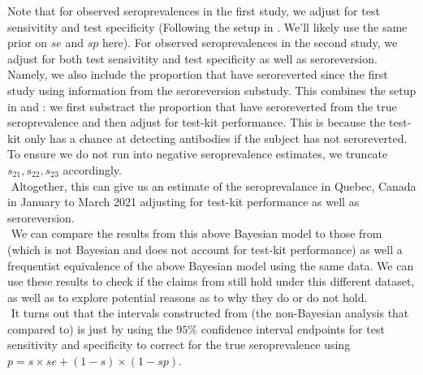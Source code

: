 Note that for observed seroprevalences in the first study, we adjust for test sensivitity and test specificity (Following the setup in \cite{meyer2022adjusting}. We'll likely use the same prior on $se$ and $sp$ here). For observed seroprevalences in the second study, we adjust for both test sensivitity and test specificity as well as seroreversion. Namely, we also include the proportion that have seroreverted since the first study using information from the seroreversion substudy. This combines the setup in \cite{lewin2022seroprevalence} and \cite{meyer2022adjusting}: we first substract the proportion that have seroreverted from the true seroprevalence and then adjust for test-kit performance. This is because the test-kit only has a chance at detecting antibodies if the subject has not seroreverted. To ensure we do not run into negative seroprevalence estimates, we truncate $s_{21}, s_{22}, s_{23}$ accordingly.\\
\newline $ $
Altogether, this can give us an estimate of the seroprevalance in Quebec, Canada in January to March 2021 adjusting for test-kit performance as well as seroreversion.\\
\newline $ $
We can compare the results from this above Bayesian model to those from \cite{lewin2022seroprevalence} (which is not Bayesian and does not account for test-kit performance) as well a frequentist equivalence of the above Bayesian model using the same data. We can use these results to check if the claims from \cite{lewin2022seroprevalence} still hold under this different dataset, as well as to explore potential reasons as to why they do or do not hold.\\
\newline $ $
It turns out that the intervals constructed from \cite{rosenberg2020cumulative} (the non-Bayesian analysis that \cite{meyer2022adjusting} compared to) is just by using the $95\%$ confidence interval endpoints for test sensitivity and specificity to correct for the true seroprevalence using $p = s \times se + (1-s) \times (1-sp)$.

